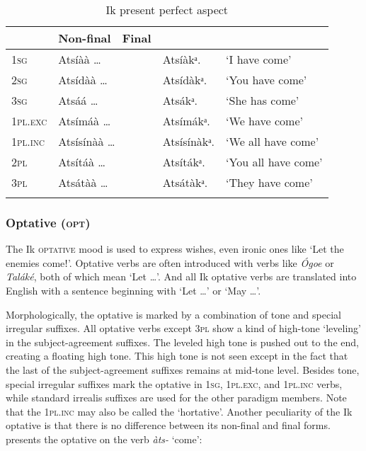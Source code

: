 \begin{table}
\caption{Ik present perfect aspect}
\label{tab:verbs:perf}


\begin{tabularx}{\textwidth}{XXXXl}
\lsptoprule

\multicolumn{2}{X}{} & Non-final & Final & \\
\midrule
\textsc{1sg} & \multicolumn{2}{X}{Atsíàà {\dots}} & Atsíàkᵃ. & ‘I have come’\\
\textsc{2sg} & \multicolumn{2}{X}{Atsídàà {\dots}} & Atsídàkᵃ. & ‘You have come’\\
\textsc{3sg} & \multicolumn{2}{X}{Atsáá {\dots}} & Atsákᵃ. & ‘She has come’\\
\textsc{1pl.exc} & \multicolumn{2}{X}{Atsímáà {\dots}} & Atsímákᵃ. & ‘We have come’\\
\textsc{1pl.inc} & \multicolumn{2}{X}{Atsísínàà {\dots}} & Atsísínàkᵃ. & ‘We all have come’\\
\textsc{2pl} & \multicolumn{2}{X}{Atsítáà {\dots}} & Atsítákᵃ. & ‘You all have come’\\
\textsc{3pl} & \multicolumn{2}{X}{Atsátàà {\dots}} & Atsátàkᵃ. & ‘They have come’\\
\lspbottomrule
\end{tabularx}
\end{table}

\subsubsection{Optative (\textsc{opt})}\label{sec:8.10.3}

The Ik \textsc{optative} mood is used to express wishes, even ironic ones like ‘Let the enemies comeǃ’. Optative verbs are often introduced with  verbs like \textit{\'{O}goe} or \textit{Taláké}, both of which mean ‘Let {\dots}’. And all Ik optative verbs are translated into English with a sentence beginning with ‘Let {\dots}’ or ‘May {\dots}’. 

Morphologically, the optative is marked by a combination of tone and special irregular suffixes. All optative verbs except 3\textsc{pl} show a kind of high-tone ‘leveling’ in the subject-agreement suffixes. The leveled high tone is pushed out to the end, creating a floating high tone. This high tone is not seen except in the fact that the last  of the subject-agreement suffixes remains at mid-tone level. Besides tone, special irregular suffixes mark the optative in \textsc{1sg}, 1\textsc{pl.exc}, and 1\textsc{pl.inc} verbs, while standard irrealis suffixes are used for the other paradigm members. Note that the 1\textsc{pl.inc} may also be called the ‘hortative’. Another peculiarity of the Ik optative is that there is no difference between its non-final and final forms.  presents the optative on the verb \textit{àts-} ‘come’:



